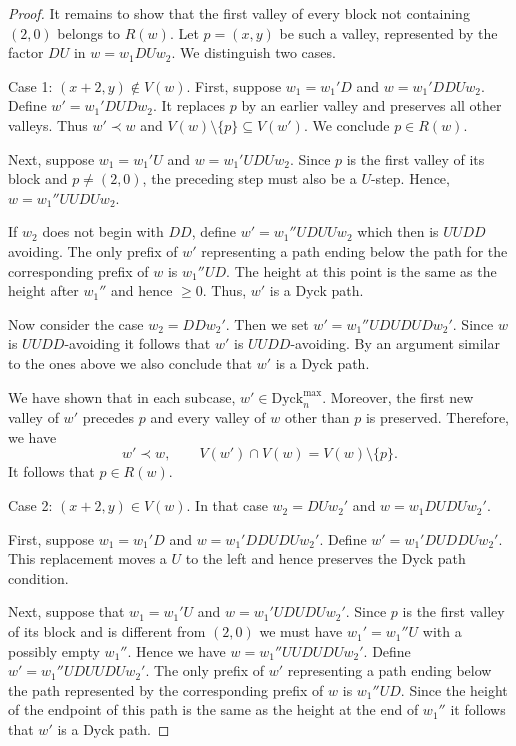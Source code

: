 \documentclass[11pt]{amsart}
\def\Dyck{\mathrm{Dyck}}
\theoremstyle{plain}
\numberwithin{lemma}{\DefaultNumberTheoremWithin}
\numberwithin{theorem}{\DefaultNumberTheoremWithin}
\numberwithin{corollary}{\DefaultNumberTheoremWithin}
\numberwithin{proposition}{\DefaultNumberTheoremWithin}
\numberwithin{conjecture}{\DefaultNumberTheoremWithin}
\theoremstyle{definition}
\numberwithin{definition}{\DefaultNumberTheoremWithin}
\numberwithin{question}{\DefaultNumberTheoremWithin}
\numberwithin{problem}{\DefaultNumberTheoremWithin}
\theoremstyle{remark}
\numberwithin{remark}{\DefaultNumberTheoremWithin}
\numberwithin{example}{\DefaultNumberTheoremWithin}
\numberwithin{claim}{\DefaultNumberTheoremWithin}
\begin{document}
\begin{proof}
It remains to show that the first valley of every block not containing $(2,0)$ belongs to $R(w)$. Let $p = (x,y)$ be such a valley, represented by the factor $DU$ in $w = w_1DUw_2$. We distinguish two cases.

\medskip
\noindent\textsf{Case 1: $(x+2,y) \not\in V(w)$.}
First, suppose $w_1 = w_1'D$ and  
$w=w_1'DDUw_2.$
Define
$w'=w_1'DUDw_2.$
It replaces $p$ by an
earlier valley and preserves all other valleys. Thus $w' \prec w$ and
$V(w) \setminus \{p\} \subseteq V(w')$. We conclude $p \in R(w)$.

Next, suppose $w_1 = w_1'U$ and $w=w_1'UDUw_2.$ 
Since
$p$ is the first valley of its block and $p\neq(2,0)$, the
preceding step must also be a $U$-step. Hence,
$w=w_1''UUDUw_2.$

If $w_2$ does not begin with $DD$, define
$w'=w_1''UDUUw_2$ which then is $UUDD$ avoiding.
The only prefix of $w'$ representing a path ending below the 
path for the corresponding prefix of
$w$ is $w_1''UD$. The height at this point is the same as the height
after $w_1''$ and hence $\geq 0$.
Thus, $w'$ is a Dyck path.

Now consider the case $w_2=DDw_2'$. Then we set 
$w' = w_1''UDUDUDw_2'$. Since $w$ is $UUDD$-avoiding it follows
that $w'$ is $UUDD$-avoiding. By an argument similar to the ones above
we also conclude that $w'$ is a Dyck path. 

We have shown that in each subcase, 
$w'\in\Dyck_n^{\max}.$
Moreover, the first new valley of $w'$ precedes $p$ and every valley
of $w$ other than $p$ is preserved. Therefore, we have
\[
w'\prec w,
\qquad
V(w')\cap V(w)=V(w)\setminus\{p\}.
\]
It follows that $p\in R(w)$.

\medskip

\noindent\textsf{Case 2: $(x+2,y) \in V(w)$.}
In that case $w_2 = DUw_2'$ and $w = w_1DUDUw_2'$. 
 
First, suppose $w_1 = w_1'D$ and $w=w_1'DDUDUw_2'$.
Define
$w'=w_1'DUDDUw_2'.$
This replacement moves a $U$ to the left and hence preserves
the Dyck path condition.

Next, suppose that $w_1 = w_1'U$ and $w=w_1'UDUDUw_2'$.
Since $p$ is the first valley of its block and is different from 
$(2,0)$ we must have $w_1' = w_1''U$ with a possibly empty 
$w_1''$. Hence we have $w=w_1''UUDUDUw_2'$.
Define
$w'=w_1''UDUUDUw_2'$.
The only prefix of $w'$ representing a path ending below the
path represented by the corresponding prefix of $w$ is 
$w_1''UD$. Since the height of the endpoint of this path is the
same as the height at the end of $w_1''$ it follows that $w'$ is
a Dyck path. 


\end{proof}
\end{document}
